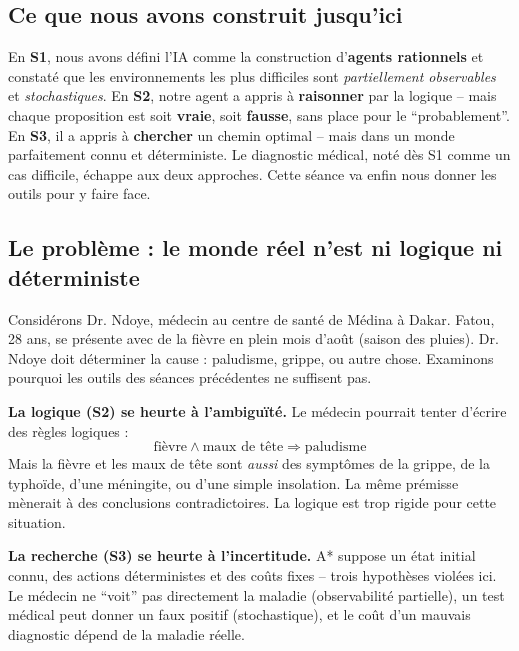 \documentclass[11pt,a4paper]{article}
\begin{document}
\subsection{Ce que nous avons construit jusqu'ici}

En \textbf{S1}, nous avons défini l'IA comme la construction d'\textbf{agents rationnels} et constaté que les environnements les plus difficiles sont \textit{partiellement observables} et \textit{stochastiques}. En \textbf{S2}, notre agent a appris à \textbf{raisonner} par la logique -- mais chaque proposition est soit \textbf{vraie}, soit \textbf{fausse}, sans place pour le ``probablement''. En \textbf{S3}, il a appris à \textbf{chercher} un chemin optimal -- mais dans un monde parfaitement connu et déterministe. Le diagnostic médical, noté dès S1 comme un cas difficile, échappe aux deux approches. Cette séance va enfin nous donner les outils pour y faire face.

\subsection{Le problème : le monde réel n'est ni logique ni déterministe}

Considérons Dr. Ndoye, médecin au centre de santé de Médina à Dakar. Fatou, 28 ans, se présente avec de la fièvre en plein mois d'août (saison des pluies). Dr. Ndoye doit déterminer la cause : paludisme, grippe, ou autre chose. Examinons pourquoi les outils des séances précédentes ne suffisent pas.

\textbf{La logique (S2) se heurte à l'ambiguïté.}
Le médecin pourrait tenter d'écrire des règles logiques :
$$\text{fièvre} \land \text{maux de tête} \Rightarrow \text{paludisme}$$
Mais la fièvre et les maux de tête sont \textit{aussi} des symptômes de la grippe, de la typhoïde, d'une méningite, ou d'une simple insolation. La même prémisse mènerait à des conclusions contradictoires. La logique est trop rigide pour cette situation.

\textbf{La recherche (S3) se heurte à l'incertitude.}
A* suppose un état initial connu, des actions déterministes et des coûts fixes -- trois hypothèses violées ici. Le médecin ne ``voit'' pas directement la maladie (observabilité partielle), un test médical peut donner un faux positif (stochastique), et le coût d'un mauvais diagnostic dépend de la maladie réelle.
\end{document}
